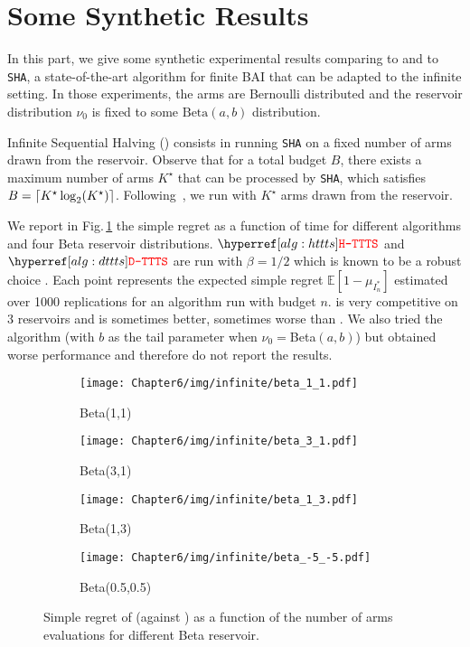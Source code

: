 \section{Some Synthetic Results}\label{app:dttts.experiments}
In this part, we give some synthetic experimental results comparing \DTTTS to \Hyperband and to \texttt{SHA}, a state-of-the-art algorithm for finite BAI that can be adapted to the infinite setting. In those experiments, the arms are Bernoulli distributed and the reservoir distribution $\nu_0$ is fixed to some $\text{Beta}(a,b)$ distribution. 

Infinite Sequential Halving (\ISHA) consists in running \texttt{SHA} on a fixed number of arms drawn from the reservoir. Observe that for a total budget $B$, there exists a maximum number of arms $K^\star$ that can be processed by \texttt{SHA}, which satisfies $B = \lceil K^\star\log_2(K^\star)\rceil$. Following~\cite{aziz2018infinite}, we run \ISHA with $K^\star$ arms drawn from the reservoir. %

We report in Fig.\,\ref{fig:dttts} the simple regret as a function of time for different algorithms and four Beta reservoir distributions. $\HTTTS$ and $\DTTTS$ are run with $\beta=1/2$ which is known to be a robust choice \citep{russo2016ttts}. Each point represents the expected simple regret $\mathbb{E}[1 - \mu_{I_n^*}]$ estimated over 1000 replications for an algorithm run with budget $n$. \DTTTS is very competitive on 3 reservoirs and \HTTTS is sometimes better, sometimes worse than \Hyperband. We also tried the \SiRI algorithm \citep{carpentier2015siri} (with $b$ as the tail parameter when $\nu_0=$Beta$(a,b)$) but obtained worse performance and therefore do not report the results.

\begin{figure}[ht]
  \centering
  \begin{subfigure}[t]{0.33\textwidth}
    \centering\texttt{[image: Chapter6/img/infinite/beta\_1\_1.pdf]}
    \caption{Beta(1,1)}
  \end{subfigure}%
\begin{subfigure}[t]{0.33\textwidth}
    \centering\texttt{[image: Chapter6/img/infinite/beta\_3\_1.pdf]}
    \caption{Beta(3,1)}
  \end{subfigure}
  \begin{subfigure}[t]{0.33\textwidth}
    \centering\texttt{[image: Chapter6/img/infinite/beta\_1\_3.pdf]}
    \caption{Beta(1,3)}
  \end{subfigure}%
  \begin{subfigure}[t]{0.33\textwidth}
    \centering\texttt{[image: Chapter6/img/infinite/beta\_-5\_-5.pdf]}
    \caption{Beta(0.5,0.5)}
  \end{subfigure}
  \caption{Simple regret of \DTTTS (against \Hyperband) as a function of the number of arms evaluations for different Beta reservoir.}
  \label{fig:dttts}
\end{figure}

